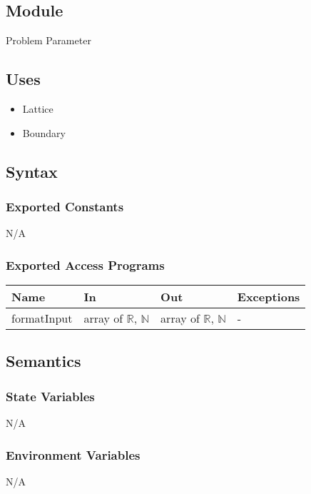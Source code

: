 \documentclass[12pt, titlepage]{article}
\begin{document}
\subsection{Module}

Problem Parameter

\subsection{Uses}

\begin{itemize}
	\item Lattice
	\item Boundary
\end{itemize}

\subsection{Syntax}

\subsubsection{Exported Constants}
N/A

\subsubsection{Exported Access Programs}

\begin{center}
	\begin{tabular}{p{2cm} p{4cm} p{4cm} p{2cm}}
		\hline
		\textbf{Name} & \textbf{In} & \textbf{Out} & \textbf{Exceptions} \\
		\hline
		formatInput & array of $\mathbb{R}$, $\mathbb{N}$ & array of $\mathbb{R}$, $\mathbb{N}$ & - \\
		\hline
	\end{tabular}
\end{center}

\subsection{Semantics}

\subsubsection{State Variables}
N/A

\subsubsection{Environment Variables}
N/A
\end{document}
